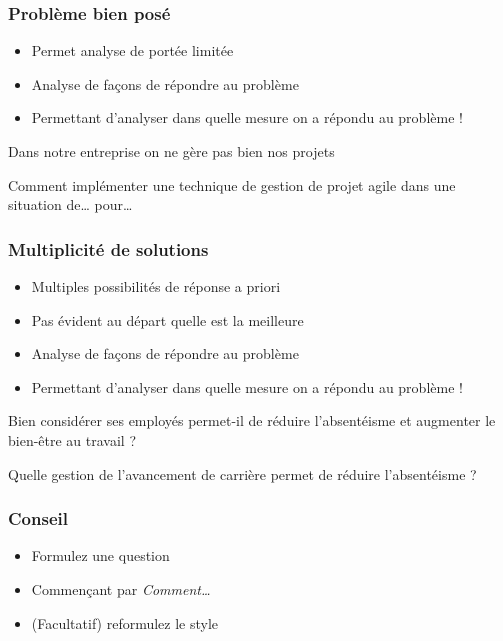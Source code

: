 \documentclass[french]{beamer}
\begin{document}
\begin{frame}
	\frametitle{Problème bien posé}
	\begin{itemize}
		\item Permet analyse de portée limitée
		\item Analyse de façons de répondre au problème
		\item Permettant d’analyser dans quelle mesure on a répondu au problème !
	\end{itemize}
	\begin{example}
		Dans notre entreprise on ne gère pas bien nos projets
	\end{example}
	\begin{example}
		Comment implémenter une technique de gestion de projet agile dans une situation de… pour…
	\end{example}
\end{frame}

\begin{frame}
	\frametitle{Multiplicité de solutions}
	\begin{itemize}
		\item Multiples possibilités de réponse a priori
		\item Pas évident au départ quelle est la meilleure
		\item Analyse de façons de répondre au problème
		\item Permettant d’analyser dans quelle mesure on a répondu au problème !
	\end{itemize}
	\begin{example}
		Bien considérer ses employés permet-il de réduire l’absentéisme et augmenter le bien-être au travail ?
	\end{example}
	\begin{example}
		Quelle gestion de l’avancement de carrière permet de réduire l’absentéisme ?
	\end{example}
\end{frame}

\begin{frame}
	\frametitle{Conseil}
	\begin{itemize}
		\item Formulez une question
		\item Commençant par \emph{Comment…}
		\item (Facultatif) reformulez le style
	\end{itemize}
\end{frame}
\end{document}
